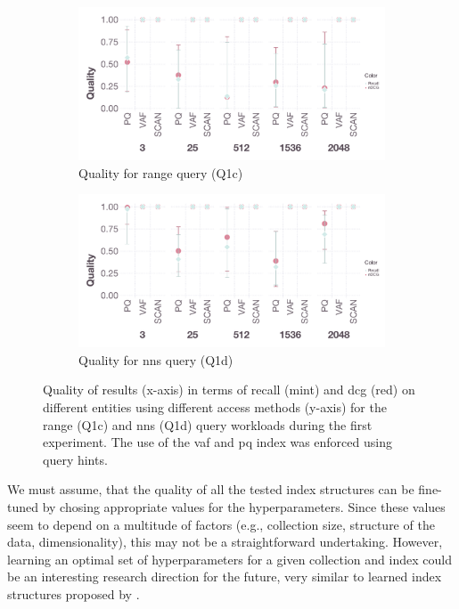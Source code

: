 \begin{figure}[tb]
    \centering
    \begin{subfigure}[b]{\textwidth}
        \centering
        \includegraphics[width=\textwidth]{figures/analytics/analytics-cottontail-quality-range}
        \caption{Quality for range query (Q1c)}
        \label{figure:cottontail_analytics_quality_range}
    \end{subfigure}
    \hfill
    \centering
    \begin{subfigure}[b]{\textwidth}
        \centering
        \includegraphics[width=\textwidth]{figures/analytics/analytics-cottontail-quality-nns}
        \caption{Quality for \acrshort{nns} query (Q1d)}
        \label{figure:cottontail_analytics_quality_nns}
    \end{subfigure}
    \caption{Quality of results (x-axis) in terms of recall (mint) and \acrshort{dcg} (red) on different entities using different access methods (y-axis) for the range (Q1c) and \acrshort{nns} (Q1d) query workloads during the first experiment. The use of the \acrshort{vaf} and \acrshort{pq} index was enforced using query hints.}
    \label{figure:cottontail_analytics_quality}
\end{figure}

We must assume, that the quality of all the tested index structures can be fine-tuned by chosing appropriate values for the hyperparameters. Since these values seem to depend on a multitude of factors (e.g., collection size, structure of the data, dimensionality), this may not be a straightforward undertaking. However, learning an optimal set of hyperparameters for a given collection and index  could be an interesting research direction for the future, very similar to learned index structures proposed by \cite{Kraska:2018Case}.

